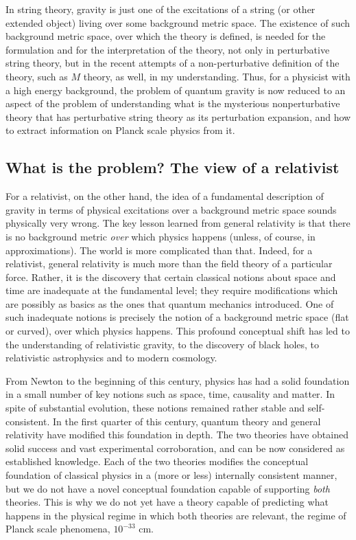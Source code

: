 \documentclass[12pt]{article}
\begin{document}
In string theory, gravity is just one of the excitations of a string 
(or other extended object) living over some background metric space.  
The existence of such background metric space, over which the theory 
is defined, is needed for the formulation and for the interpretation 
of the theory, not only in perturbative string theory, but in the 
recent attempts of a non-perturbative definition of the theory, such 
as $M$ theory, as well, in my understanding.  Thus, for a physicist 
with a high energy background, the problem of quantum gravity is now 
reduced to an aspect of the problem of understanding what is the 
mysterious nonperturbative theory that has perturbative string theory 
as its perturbation expansion, and how to extract information on 
Planck scale physics from it.

\subsection{What is the problem? The view of a relativist}

For a relativist, on the other hand, the idea of a fundamental 
description of gravity in terms of physical excitations over a 
background metric space sounds physically very wrong.  The key lesson 
learned from general relativity is that there is no background metric 
\textit{over} which physics happens (unless, of course, in 
approximations).  The world is more complicated than that.  Indeed, 
for a relativist, general relativity is much more than the field 
theory of a particular force.  Rather, it is the discovery that 
certain classical notions about space and time are inadequate at the 
fundamental level; they require modifications which are possibly as 
basics as the ones that quantum mechanics introduced.  One of such 
inadequate notions is precisely the notion of a background metric 
space (flat or curved), over which physics happens.  This profound 
conceptual shift has led to the understanding of relativistic gravity, 
to the discovery of black holes, to relativistic astrophysics and to 
modern cosmology.

From Newton to the beginning of this century, physics has had a solid 
foundation in a small number of key notions such as space, time, 
causality and matter.  In spite of substantial evolution, these 
notions remained rather stable and self-consistent.  In the first 
quarter of this century, quantum theory and general relativity have 
modified this foundation in depth.  The two theories have obtained 
solid success and vast experimental corroboration, and can be now 
considered as established knowledge.  Each of the two theories 
modifies the conceptual foundation of classical physics in a (more or 
less) internally consistent manner, but we do not have a novel 
conceptual foundation capable of supporting \textit{both} theories.  
This is why we do not yet have a theory capable of predicting what 
happens in the physical regime in which both theories are relevant, 
the regime of Planck scale phenomena, $10^{-33}$ cm.
\end{document}
